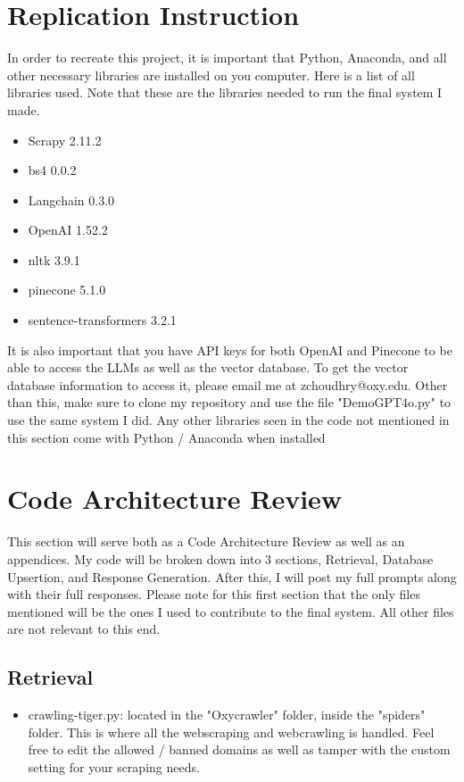 \documentclass[10pt,twocolumn]{article}
\begin{document}
\section{Replication Instruction}
In order to recreate this project, it is important that Python, Anaconda, and all other necessary libraries are installed on you computer.
Here is a list of all libraries used. Note that these are the libraries needed to run the final system I made.
\begin{itemize}
    \item Scrapy 2.11.2
    \item bs4 0.0.2 
    \item Langchain 0.3.0
    \item OpenAI 1.52.2
    \item nltk 3.9.1
    \item pinecone 5.1.0
    \item sentence-transformers 3.2.1
\end{itemize}
It is also important that you have API keys for both OpenAI and Pinecone to be able to access the LLMs as well as the vector database. To get the vector database information to access it, please email me at zchoudhry@oxy.edu. Other than this, make sure to clone my repository and use the file "DemoGPT4o.py" to use the same system I did. Any other libraries seen in the code not mentioned in this section come with Python / Anaconda when installed


\section{Code Architecture Review}
This section will serve both as a Code Architecture Review as well as an appendices. My code will be broken down into 3 sections, Retrieval, Database Upsertion, and Response Generation. After this, I will post my full prompts along with their full responses. Please note for this first section that the only files mentioned will be the ones I used to contribute to the final system. All other files are not relevant to this end.
\subsection{Retrieval}
\begin{itemize}
    \item crawling-tiger.py: located in the "Oxycrawler" folder, inside the "spiders" folder. This is where all the webscraping and webcrawling is handled. Feel free to edit the allowed / banned domains as well as tamper with the custom setting for your scraping needs.
\end{itemize}
\end{document}

